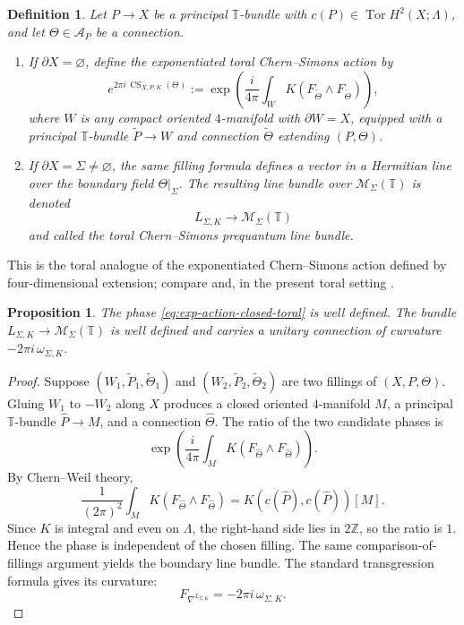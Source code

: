 \documentclass[12pt]{amsart}
\numberwithin{equation}{section}
\newtheorem{prop}[theorem]{Proposition}
\newtheorem{definition}[theorem]{Definition}
\begin{document}
\begin{definition}
\label{def:exp-CS-toral}
Let \(P\to X\) be a principal \(\mathbb T\)-bundle with \(c(P)\in \operatorname{Tor}H^2(X;\Lambda)\),
and let \(\Theta\in \mathcal A_P\) be a connection.

\begin{enumerate}\renewcommand{\labelenumi}{(\roman{enumi})}
\item If \(\partial X=\varnothing\), define the exponentiated toral Chern--Simons action by
\begin{equation}
\label{eq:exp-action-closed-toral}
e^{2\pi i\,\operatorname{CS}_{X,P,K}(\Theta)}
:=
\exp\!\left(
\frac{i}{4\pi}\int_W K(F_{\widetilde\Theta}\wedge F_{\widetilde\Theta})
\right),
\end{equation}
where \(W\) is any compact oriented \(4\)-manifold with \(\partial W=X\), equipped with a
principal \(\mathbb T\)-bundle \(\widetilde P\to W\) and connection \(\widetilde\Theta\) extending
\((P,\Theta)\).

\item If \(\partial X=\Sigma\neq\varnothing\), the same filling formula defines a vector in a
Hermitian line over the boundary field \(\Theta|_\Sigma\). The resulting line bundle over
\(\mathcal M_\Sigma(\mathbb T)\) is denoted
\[
L_{\Sigma,K}\longrightarrow \mathcal M_\Sigma(\mathbb T)
\]
and called the toral Chern--Simons prequantum line bundle.
\end{enumerate}
\end{definition}

This is the toral analogue of the exponentiated Chern--Simons action defined by four-dimensional extension; compare \cite{FreedCS} and, in the present toral setting \cite{Galviz2}.

\begin{prop}
\label{prop:well-defined-exp-action-toral}
The phase \eqref{eq:exp-action-closed-toral} is well defined. The bundle
\(L_{\Sigma,K}\to \mathcal M_\Sigma(\mathbb T)\) is well defined and carries a unitary
connection of curvature \(-2\pi i\,\omega_{\Sigma,K}\).
\end{prop}

\begin{proof}
Suppose \((W_1,\widetilde P_1,\widetilde\Theta_1)\) and
\((W_2,\widetilde P_2,\widetilde\Theta_2)\) are two fillings of \((X,P,\Theta)\). Gluing
\(W_1\) to \(-W_2\) along \(X\) produces a closed oriented \(4\)-manifold \(M\), a principal
\(\mathbb T\)-bundle \(\widehat P\to M\), and a connection \(\widehat\Theta\). The ratio of the
two candidate phases is
\[
\exp\!\left(
\frac{i}{4\pi}\int_M K(F_{\widehat\Theta}\wedge F_{\widehat\Theta})
\right).
\]
By Chern--Weil theory,
\[
\frac{1}{(2\pi)^2}\int_M K(F_{\widehat\Theta}\wedge F_{\widehat\Theta})
=
K(c(\widehat P),c(\widehat P))[M].
\]
Since \(K\) is integral and even on \(\Lambda\), the right-hand side lies in \(2\mathbb Z\), so
the ratio is \(1\). Hence the phase is independent of the chosen filling. The same comparison-of-fillings argument yields the boundary line bundle. The standard
transgression formula gives its curvature:
\[
F_{\nabla^{L_{\Sigma,K}}}=-2\pi i\,\omega_{\Sigma,K}.
\]
\end{proof}
\end{document}

